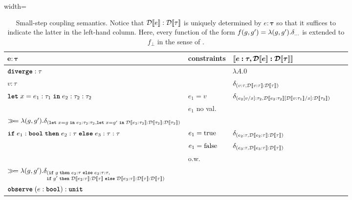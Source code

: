 
\begin{table}[t]
	\caption{Small-step coupling semantics. Notice that $\mathcal{D}\llbracket e \rrbracket : \mathcal{D}\llbracket \tau \rrbracket$ is uniquely determined by $e \boldsymbol{:} \boldsymbol{\tau}$ so that it suffices to indicate the latter in the left-hand column. Here, every function of the form $f(g,g') = \lambda (g,g').\delta_{\ldots}$ is extended to $f_{\bot}$ in the sense of .}
	\label{tab:coupling_smallstep_1}%
	\begin{center}
		\begin{adjustbox}{width=\textwidth}
		\begin{tabular}{l l l l l}
			\toprule
			\toprule
						$\mathbf{e \boldsymbol{:} \boldsymbol{\tau}}$ & \textbf{constraints}  & $\boldsymbol{\llbracket e : \tau, \mathcal{D}\llbracket e \rrbracket : \mathcal{D}\llbracket \tau \rrbracket \rrbracket}$   \\
			\hline 
			\multirow{1}{*}{$\textnormal{\ttfamily\bfseries diverge} : \tau$} 
			
			& & $\lambda A.0$  \\
			\midrule
			$v : \tau$ & & $\delta_{(v:\tau,\mathcal{D}\llbracket v:\tau \rrbracket : \mathcal{D}\llbracket \tau \rrbracket)}$ \\[0.5ex]
			\midrule
			\multirow{2}{*}{$\textnormal{\ttfamily\bfseries let} \; x = e_1 : \tau_1 \; \textnormal{\ttfamily\bfseries in} \; e_2 : \tau_2 : \tau_2$} 
			
			& $e_1=v$ & $\delta_{(e_2[v/x] : \tau_2, \mathcal{D}\llbracket e_2 : \tau_2 \rrbracket[\mathcal{D}\llbracket v : \tau_1 \rrbracket/x] : \mathcal{D}\llbracket \tau_2 \rrbracket)}$ \\
			& $e_1$ no val.\ & \makecell[l]{$\sem{ e_1 : \tau_1, \discretize{e_1 : \tau_1} : \discretize{\tau_1}}$ \\
			$\gg\!= \lambda (g,g'). \delta_{(\textnormal{\ttfamily\bfseries let} \; x = g\; \textnormal{\ttfamily\bfseries in} \; e_2 : \tau_2 : \tau_2,
			\textnormal{\ttfamily\bfseries let} \; x = g' \; \textnormal{\ttfamily\bfseries in} \; \mathcal{D}\llbracket e_2 : \tau_2 \rrbracket : \mathcal{D}\llbracket \tau_2 \rrbracket : \mathcal{D}\llbracket \tau_2 \rrbracket)}$} \\
			\midrule 
			\multirow{3}{*}{$\textnormal{\ttfamily\bfseries if} \; e_1 : \textnormal{\ttfamily\bfseries bool} \; \textnormal{\ttfamily\bfseries then} \; e_2 : \tau \; \textnormal{\ttfamily\bfseries else} \; e_3 : \tau : \tau$} 
			
			& $e_1=\textnormal{true}$ & $\delta_{(e_2 : \tau, \mathcal{D}\llbracket e_2 : \tau \rrbracket : \mathcal{D}\llbracket \tau \rrbracket)} $ \\
			& $e_1=\textnormal{false}$ & $\delta_{(e_3 : \tau, \mathcal{D}\llbracket e_3 : \tau \rrbracket : \mathcal{D}\llbracket \tau \rrbracket)} $ \\
			& o.w.\ & \makecell[l]{$\sem{ e_1 : \bool, \discretize{e_1 : \bool} : \discretize{\bool}}$ \\
			$\gg\!= \lambda (g,g'). \delta_{\begin{subarray}{l}(\textnormal{\ttfamily\bfseries if} \; g\; \textnormal{\ttfamily\bfseries then} \; e_2 : \tau \; \textnormal{\ttfamily\bfseries else} \; e_3 : \tau : \tau, \\ \textnormal{\ttfamily\bfseries if} \; g' \; \textnormal{\ttfamily\bfseries then} \; \mathcal{D}\llbracket e_2 : \tau \rrbracket : \mathcal{D}\llbracket \tau \rrbracket \; \textnormal{\ttfamily\bfseries else} \; \mathcal{D}\llbracket e_3 : \tau \rrbracket : \mathcal{D}\llbracket \tau \rrbracket : \mathcal{D}\llbracket \tau \rrbracket)\end{subarray}}$} \\
			\midrule 
			\multirow{3}{*}{$\textnormal{\ttfamily\bfseries observe}\; (e : \textnormal{\ttfamily\bfseries bool})  : \textnormal{\ttfamily\bfseries unit}$} 
			

\end{tabular}
\end{adjustbox}
\end{center}
\end{table}
